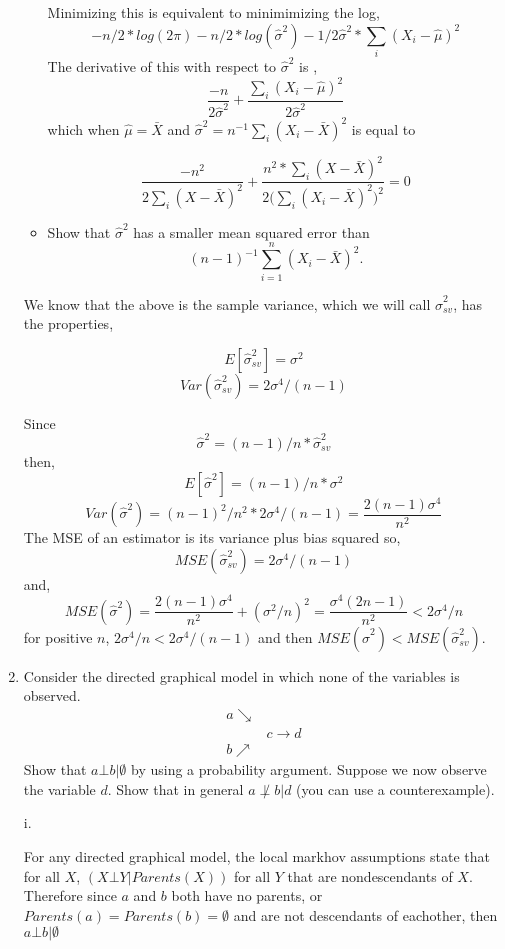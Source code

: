\documentclass{article}
\begin{document}
\begin{enumerate}
\begin{itemize}
Minimizing this is equivalent to minimimizing the log,
$$
-n/2 * log(2\pi) -n/2 *log(\hat\sigma^2) - 1/2 \hat\sigma^2 * \sum_i (X_i - \hat\mu)^2
$$
The derivative of this with respect to $\hat\sigma^2$ is ,
$$\frac{-n}{2\hat\sigma^2} + \frac{\sum_i (X_i - \hat\mu)^2}{2 \hat\sigma^2}$$
which when $\hat\mu = \bar{X}$ and 
$\hat\sigma^2 = n^{-1} \sum_i (X_i - \bar{X})^2$ is equal to 


$$
\frac{-n^2}{2 \sum_i (X - \bar{X})^2} + \frac{n^2 * \sum_i (X- \bar{X})^2}{2 \big(\sum_i (X_i - \bar {X})^2 \big)^2} = 0
$$

\color{black}


\item Show that ${\hat\sigma}^2$ has a smaller mean squared error than 
$$(n-1)^{-1} \sum_{i=1}^n (X_i - \bar X)^2.$$
\end{itemize}
\color{blue}
We know that the above is the sample variance, which we will call $\hat\sigma_{sv}^2$,
has the properties,

$$E[\hat\sigma^2_{sv}] = \sigma^2$$
$$Var(\hat\sigma^2_{sv}) =  2\sigma^4/(n-1)$$

Since $$\hat\sigma ^2 = (n-1)/n * \hat\sigma^2_{sv}$$
then,
$$
E[\hat\sigma^2] = (n-1)/n * \sigma^2
$$
$$
Var(\hat\sigma^2) = (n-1)^2/n^2 * 2\sigma^4/(n-1) = \frac{2(n-1)\sigma^4}{n^2}
$$
The MSE of an estimator is its variance plus bias squared so,
$$
MSE(\hat\sigma^2_{sv}) = 2\sigma^4/(n-1)
$$
and,
$$
MSE(\hat\sigma^2) = \frac{2(n-1)\sigma^4}{n^2} + (\sigma^2/n)^2 = \frac{\sigma^4 (2n-1)}{n^2} < 2\sigma^4 / n
$$
for positive $n$, $2\sigma^4/n < 2\sigma^4 / (n-1)$
and then
$MSE(\hat\sigma^2) < MSE(\hat\sigma^2_{sv})$.  

\color{black}

\item
Consider the directed graphical model in which none of the variables is observed.  
$$
\begin{array}{cc}
a \searrow &  \\
& c \rightarrow d \\
b \nearrow &
\end{array}
$$
Show that $a \bot b \vert \emptyset$ by using a probability argument.
Suppose we now observe the variable $d$.  Show that in general $a \not\perp b \vert d$ (you can use a counterexample).

\color{blue}
i. 

For any directed graphical model, the local markhov assumptions state that for all $X$,  
$
(X \bot Y | Parents(X)) 
$ for all $Y$ that are nondescendants of $X$. Therefore since $a$ and $b$ both have no parents, or  $Parents(a) = Parents(b) = \emptyset$ and are not descendants of eachother, then
$
a \bot b \vert \emptyset
$


\end{enumerate}
\end{document}
